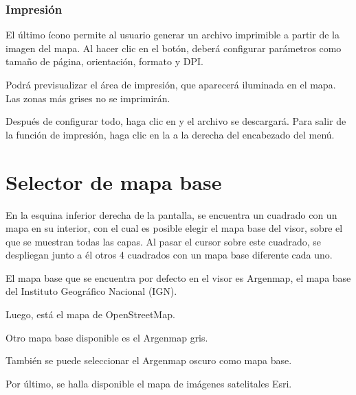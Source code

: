 \documentclass[a4paper,11pt,openany,spanish]{sphinxmanual}
\begin{document}
\subsubsection{Impresión}
\label{\detokenize{tools/measuring:impresion}}
\sphinxAtStartPar
El último ícono permite al usuario generar un archivo imprimible a partir de la imagen del mapa. Al hacer clic en el botón, deberá configurar parámetros como tamaño de página, orientación, formato y DPI.

\sphinxAtStartPar
Podrá previsualizar el área de impresión, que aparecerá iluminada en el mapa. Las zonas más grises no se imprimirán.

\sphinxAtStartPar
Después de configurar todo, haga clic en  y el archivo se descargará. Para salir de la función de impresión, haga clic en la  a la derecha del encabezado del menú.

\noindent{}

\sphinxstepscope


\section{Selector de mapa base}
\label{\detokenize{basemap/index:selector-de-mapa-base}}\label{\detokenize{basemap/index::doc}}
\sphinxAtStartPar
En la esquina inferior derecha de la pantalla, se encuentra un cuadrado con un mapa en su interior, con el cual es posible elegir el mapa base del visor, sobre el que se muestran todas las capas. Al pasar el cursor sobre este cuadrado, se despliegan junto a él otros 4 cuadrados con un mapa base diferente cada uno.


\sphinxAtStartPar
El mapa base que se encuentra por defecto en el visor es Argenmap, el mapa base del Instituto Geográfico Nacional (IGN).

\noindent{}

\sphinxAtStartPar
Luego, está el mapa de OpenStreetMap.

\noindent{}

\sphinxAtStartPar
Otro mapa base disponible es el Argenmap gris.

\noindent{}

\sphinxAtStartPar
También se puede seleccionar el Argenmap oscuro como mapa base.

\noindent{}

\sphinxAtStartPar
Por último, se halla disponible el mapa de imágenes satelitales Esri.

\noindent{}



\renewcommand{\indexname}{Índice}
\footnotesize\raggedright\printindex
\end{document}
